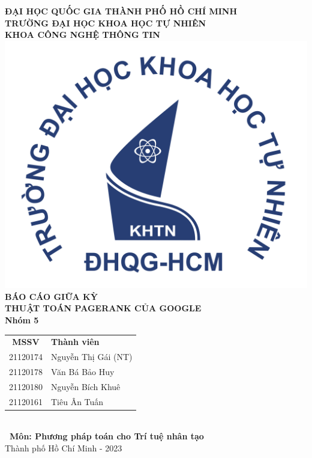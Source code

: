 \begin{titlepage}
    \begin{center}
    \textsc{\small \textbf{ĐẠI HỌC QUỐC GIA THÀNH PHỐ HỒ CHÍ MINH}}\\
    \textsc{\small \textbf{TRƯỜNG ĐẠI HỌC KHOA HỌC TỰ NHIÊN}}\\
    \textsc{\small \textbf{KHOA CÔNG NGHỆ THÔNG TIN}}\\[1.5cm]
    \includegraphics[width=.3\textwidth]{figure/logo.png}\\[3cm]
    {\fontsize{17}{17}\selectfont\bfseries BÁO CÁO GIỮA KỲ }\\[0.5cm]%
     {\fontsize{17}{17}\selectfont\bfseries THUẬT TOÁN PAGERANK CỦA GOOGLE }\\[1cm]%
    
    \textbf{\Large{Nhóm 5 }}\\[2cm]
    \begin{tabular}{cl}
        \textbf{MSSV} & \textbf{Thành viên} \\
        21120174 & Nguyễn Thị Gái (NT)\\[5.5pt]
        21120178 & Văn Bá Bảo Huy\\[5.5pt]
        21120180 & Nguyễn Bích Khuê\\[4.5pt]
        21120161 & Tiêu Ân Tuấn\\
    \end{tabular}\\[2.5cm]
    \textbf{\ Môn: Phương pháp toán cho Trí tuệ nhân tạo }\\[0.5cm]
    Thành phố Hồ Chí Minh - 2023   
    \end{center}
    
    \vfill
    \pagebreak
\end{titlepage}